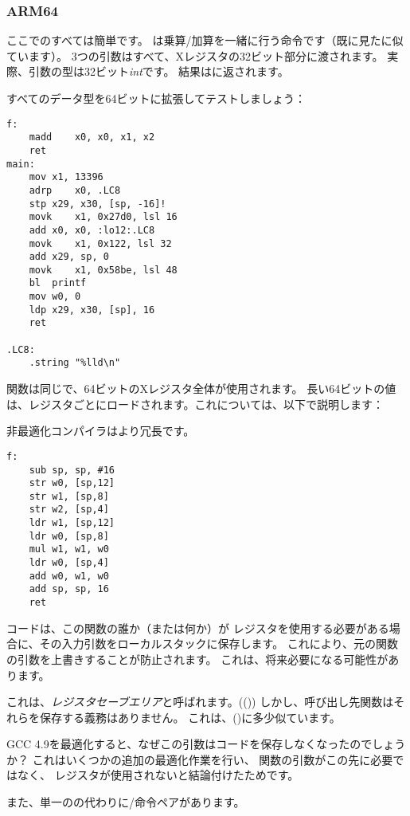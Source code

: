 \subsubsection{ARM64}


ここでのすべては簡単です。 
は乗算/加算を一緒に行う命令です（既に見たに似ています）。 
3つの引数はすべて、Xレジスタの32ビット部分に渡されます。 
実際、引数の型は32ビット\emph{int}です。 結果はに返されます。



すべてのデータ型を64ビットに拡張してテストしましょう：



\begin{lstlisting}[style=customasmARM]
f:
	madd	x0, x0, x1, x2
	ret
main:
	mov	x1, 13396
	adrp	x0, .LC8
	stp	x29, x30, [sp, -16]!
	movk	x1, 0x27d0, lsl 16
	add	x0, x0, :lo12:.LC8
	movk	x1, 0x122, lsl 32
	add	x29, sp, 0
	movk	x1, 0x58be, lsl 48
	bl	printf
	mov	w0, 0
	ldp	x29, x30, [sp], 16
	ret

.LC8:
	.string	"%lld\n"
\end{lstlisting}

\ttf 関数は同じで、64ビットのXレジスタ全体が使用されます。 
長い64ビットの値は、レジスタごとにロードされます。これについては、以下で説明します：


非最適化コンパイラはより冗長です。

\begin{lstlisting}[style=customasmARM]
f:
	sub	sp, sp, #16
	str	w0, [sp,12]
	str	w1, [sp,8]
	str	w2, [sp,4]
	ldr	w1, [sp,12]
	ldr	w0, [sp,8]
	mul	w1, w1, w0
	ldr	w0, [sp,4]
	add	w0, w1, w0
	add	sp, sp, 16
	ret
\end{lstlisting}

コードは、この関数の誰か（または何か）が
レジスタを使用する必要がある場合に、その入力引数をローカルスタックに保存します。 
これにより、元の関数の引数を上書きすることが防止されます。
これは、将来必要になる可能性があります。

これは、\emph{レジスタセーブエリア}と呼ばれます。((\ARMPCS))
しかし、呼び出し先関数はそれらを保存する義務はありません。 
これは、()に多少似ています。

GCC 4.9を最適化すると、なぜこの引数はコードを保存しなくなったのでしょうか？ 
これはいくつかの追加の最適化作業を行い、
関数の引数がこの先に必要ではなく、
レジスタが使用されないと結論付けたためです。


また、単一のの代わりに/命令ペアがあります。

